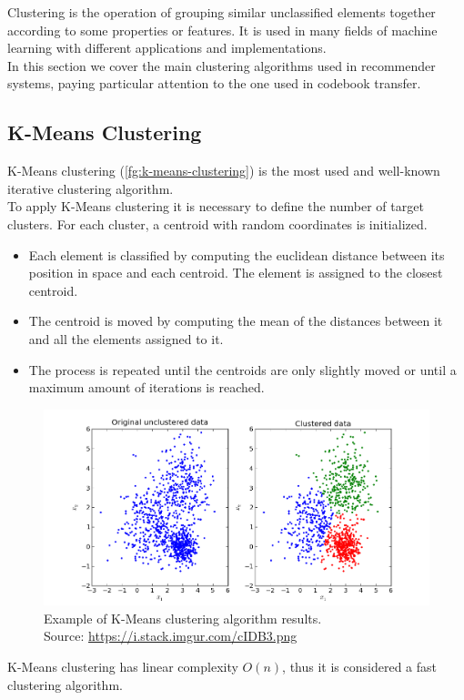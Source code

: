 Clustering is the operation of grouping similar unclassified elements together according to some properties or features. It is used in many fields of machine learning with different applications and implementations.\\
In this section we cover the main clustering algorithms used in recommender systems, paying particular attention to the one used in codebook transfer.


\subsection{K-Means Clustering}

K-Means clustering (\autoref{fg:k-means-clustering}) is the most used and well-known iterative clustering algorithm.\\
To apply K-Means clustering it is necessary to define the number of target clusters. For each cluster, a centroid with random coordinates is initialized.
\begin{itemize}
\item Each element is classified by computing the euclidean distance between its position in space and each centroid. The element is assigned to the closest centroid.
\item The centroid is moved by computing the mean of the distances between it and all the elements assigned to it.
\item The process is repeated until the centroids are only slightly moved or until a maximum amount of iterations is reached.
\end{itemize}
\begin{figure}[htb]
\centering
\includegraphics[width=\textwidth]{pictures/k-means-clustering}
\caption{Example of K-Means clustering algorithm results.\\
Source: \url{https://i.stack.imgur.com/cIDB3.png}}
\label{fg:k-means-clustering}
\end{figure}
K-Means clustering has linear complexity $O(n)$, thus it is considered a fast clustering algorithm.


